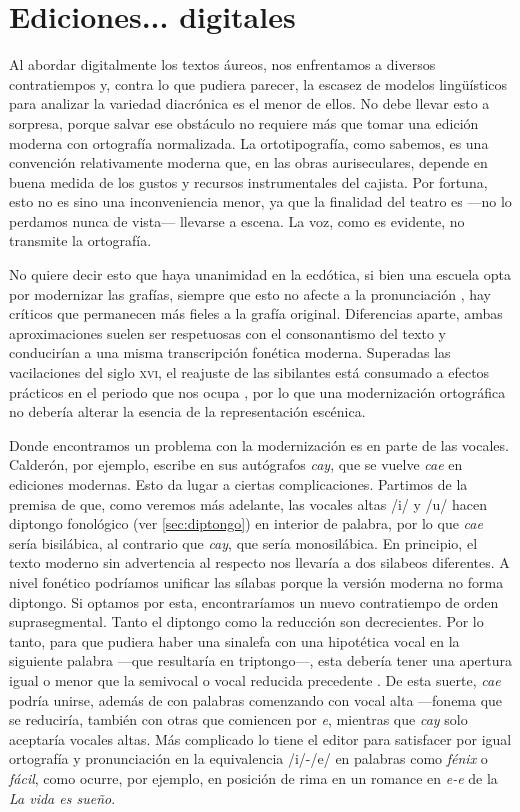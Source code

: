 \section{Ediciones... digitales}
Al abordar digitalmente los textos áureos, nos enfrentamos a diversos contratiempos y, contra lo que pudiera parecer, la escasez de modelos lingüísticos para analizar la variedad diacrónica es el menor de ellos. No debe llevar esto a sorpresa, porque salvar ese obstáculo no requiere más que tomar una edición moderna con ortografía normalizada. La ortotipografía, como sabemos, es una convención relativamente moderna que, en las obras auriseculares, depende en buena medida de los gustos y recursos instrumentales del cajista. Por fortuna, esto no es sino una inconveniencia menor, ya que la finalidad del teatro es —\nolinebreak no lo perdamos nunca de vista\nolinebreak— llevarse a escena. La voz, como es evidente, no transmite la ortografía.

No quiere decir esto que haya unanimidad en la ecdótica, si bien una escuela opta por modernizar las grafías, siempre que esto no afecte a la pronunciación \parencite[36]{arellano2007}, hay críticos que permanecen más fieles a la grafía original. Diferencias aparte, ambas aproximaciones suelen ser respetuosas con el consonantismo del texto y conducirían a una misma transcripción fonética moderna. Superadas las vacilaciones del siglo \textsc{xvi}, el reajuste de las sibilantes está consumado a efectos prácticos en el periodo que nos ocupa \parencite[91-93]{lapesa2008}, por lo que una modernización ortográfica no debería alterar la esencia de la representación escénica.

Donde encontramos un problema con la modernización es en parte de las vocales. Calderón, por ejemplo, escribe en sus autógrafos \textit{cay}, que se vuelve \textit{cae} en ediciones modernas. Esto  da lugar a ciertas complicaciones. Partimos de la premisa de que, como veremos más adelante, las vocales altas /i/ y /u/ hacen diptongo fonológico (ver \ref{sec:diptongo}) en interior de palabra, por lo que \textit{cae} sería bisilábica, al contrario que \textit{cay}, que sería monosilábica. En principio, el texto moderno sin advertencia al respecto nos llevaría a dos silabeos diferentes. A nivel fonético podríamos unificar las sílabas porque la versión moderna no forma diptongo. Si optamos por esta, encontraríamos un nuevo contratiempo de orden suprasegmental. Tanto el diptongo como la reducción son decrecientes. Por lo tanto, para que pudiera haber una sinalefa con una hipotética vocal en la siguiente palabra —que resultaría en triptongo—, esta debería tener una apertura igual o menor que la semivocal o vocal reducida precedente \parencite[]{navarrotomas1957}. De esta suerte, \textit{cae} podría unirse, además de con palabras comenzando con vocal alta —fonema que se reduciría\textemdash, también con otras que comiencen por \textit{e}, mientras que \textit{cay} solo aceptaría vocales altas. Más complicado lo tiene el editor para satisfacer por igual ortografía y pronunciación en la equivalencia /i/-/e/ en palabras como \textit{fénix} o \textit{fácil}, como ocurre, por ejemplo, en posición de rima en un romance en \textit{e-e} de la \textit{La vida es sueño}.

